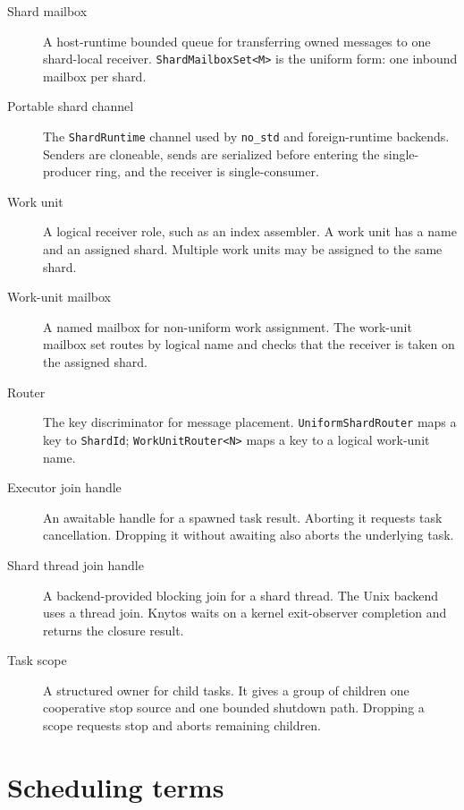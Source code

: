 \begin{description}
    \item[Shard mailbox] A host-runtime bounded queue for transferring owned
        messages to one shard-local receiver. \texttt{ShardMailboxSet<M>} is
        the uniform form: one inbound mailbox per shard.

    \item[Portable shard channel] The \texttt{ShardRuntime} channel used by
        \texttt{no\_std} and foreign-runtime backends. Senders are cloneable,
        sends are serialized before entering the single-producer ring, and the
        receiver is single-consumer.

    \item[Work unit] A logical receiver role, such as an index assembler. A
        work unit has a name and an assigned shard. Multiple work units may be
        assigned to the same shard.

    \item[Work-unit mailbox] A named mailbox for non-uniform work assignment.
        The work-unit mailbox set routes by logical name and checks that the
        receiver is taken on the assigned shard.

    \item[Router] The key discriminator for message placement.
        \texttt{UniformShardRouter} maps a key to \texttt{ShardId};
        \texttt{WorkUnitRouter<N>} maps a key to a logical work-unit name.

    \item[Executor join handle] An awaitable handle for a spawned task result.
        Aborting it requests task cancellation. Dropping it without awaiting
        also aborts the underlying task.

    \item[Shard thread join handle] A backend-provided blocking join for a
        shard thread. The Unix backend uses a thread join. Knytos waits on
        a kernel exit-observer completion and returns the closure result.

    \item[Task scope] A structured owner for child tasks. It gives a group of
        children one cooperative stop source and one bounded shutdown path.
        Dropping a scope requests stop and aborts remaining children.
\end{description}

\section{Scheduling terms}

